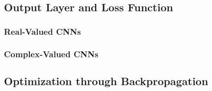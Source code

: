  \subsection{Output Layer and Loss Function}
 
 \subsubsection{Real-Valued CNNs}
 \subsubsection{Complex-Valued CNNs}
 
 \subsection{Optimization through Backpropagation}









